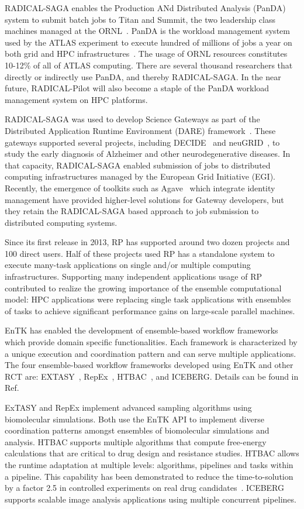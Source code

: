 \documentclass[preprint,12pt, a4paper]{elsarticle}
\begin{document}
RADICAL-SAGA enables the Production ANd Distributed Analysis (PanDA) system
to submit batch jobs to Titan and Summit, the two leadership class machines
managed at the ORNL~\cite{web-olcf-resources}. PanDA is the workload
management system used by the ATLAS experiment to execute hundred of millions
of jobs a year on both grid and HPC infrastructures~\cite{maeno2008panda}.
The usage of ORNL resources constitutes 10-12\% of all of ATLAS computing.
There are several thousand researchers that directly or indirectly use PanDA,
and thereby RADICAL-SAGA. In the near future, RADICAL-Pilot will also become
a staple of the PanDA workload management system on HPC platforms.

RADICAL-SAGA was used to develop Science Gateways as part of the Distributed
Application Runtime Environment (DARE) framework~\cite{dare}. These gateways
supported several projects, including DECIDE~\cite{decide} and
neuGRID~\cite{neugrid}, to study the early diagnosis of Alzheimer and other
neurodegenerative diseases. In that capacity, RADICAL-SAGA enabled submission
of jobs to distributed computing infrastructures managed by the European Grid
Initiative (EGI). Recently, the emergence of toolkits such as
Agave~\cite{agave} which integrate identity management have provided
higher-level solutions for Gateway developers, but they retain the
RADICAL-SAGA based approach to job submission to distributed computing
systems.

Since its first release in 2013, RP has supported around two dozen projects
and 100 direct users. Half of these projects used RP has a standalone system
to execute many-task applications on single and/or multiple computing
infrastructures. Supporting many independent applications usage of RP
contributed to realize the growing importance of the ensemble computational
model: HPC applications were replacing single task applications with
ensembles of tasks to achieve significant performance gains on large-scale
parallel machines.

EnTK has enabled the development of ensemble-based workflow frameworks which
provide domain specific functionalities. Each framework is characterized by a
unique execution and coordination pattern and can serve multiple
applications. The four ensemble-based workflow frameworks developed using
EnTK and other RCT are: EXTASY~\cite{balasubramanian2016extasy},
RepEx~\cite{treikalis2016repex}, HTBAC~\cite{dakka2018high}, and ICEBERG\@.
Details can be found in Ref.~\citep{turilli2019middleware}

ExTASY and RepEx implement advanced sampling algorithms using biomolecular
simulations. Both use the EnTK API to implement  diverse coordination
patterns amongst ensembles of biomolecular simulations and analysis. HTBAC
supports multiple algorithms that compute free-energy calculations that are
critical to drug design and resistance studies. HTBAC allows the runtime
adaptation at multiple levels: algorithms, pipelines and tasks within a
pipeline. This capability has been demonstrated to reduce the
time-to-solution by a factor 2.5 in controlled experiments on real drug
candidates~\citep{dakka2018concurrent}. ICEBERG supports scalable image
analysis applications using multiple concurrent pipelines.
\end{document}
